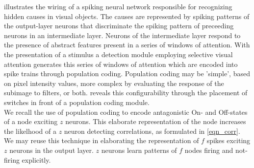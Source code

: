 \documentclass{report}
\begin{document}
 illustrates the wiring of a spiking neural network responsible for recognizing hidden causes in visual objects. The causes are represented by spiking patterns of the output-layer neurons that discriminate the spiking pattern of preceeding neurons in an intermediate layer. Neurons of the intermediate layer respond to the presence of abstract features present in a series of windows of attention. With the presentation of a stimulus a detection module employing selective visual attention generates this series of windows of attention which are encoded into spike trains through population coding. Population coding may be 'simple', based on pixel intensity values, more complex by evaluating the response of the subimage to filters, or both.  reveals this configurability through the placement of switches in front of a population coding module.\\

We recall the use of population coding to encode antagonistic On- and Off-states of a node exciting $z$ neurons. This elaborate representation of the node increases the likelhood of a $z$ neuron detecting correlations, as formulated in \ref{eqn_corr}. We may reuse this technique in elaborating the representation of $f$ spikes exciting $z$ neurons in the output layer. $z$ neurons learn patterns of $f$ nodes firing and not-firing explicitly.\\
\end{document}
